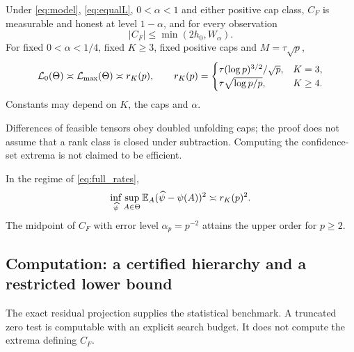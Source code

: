 \begin{theorem}\label{thm:full_minimax}
Under \eqref{eq:model}, \eqref{eq:equalL}, $0<\alpha<1$ and either positive cap class,
$C_F$ is measurable and honest at level $1-\alpha$, and for every observation
\begin{equation}\label{eq:diameter}
 |C_F|\le\min(2h_0,W_\alpha).
\end{equation}
For fixed $0<\alpha<1/4$, fixed $K\ge3$, fixed positive caps and $M=\tau\sqrt p$,
\begin{equation}\label{eq:full_rates}
 \mathcal L_0(\Theta)\asymp\mathcal L_{\max}(\Theta)\asymp r_K(p),
 \qquad
 r_K(p)=
 \begin{cases}
 \tau(\log p)^{3/2}/\sqrt p,&K=3,\\
 \tau\sqrt{\log p/p},&K\ge4.
 \end{cases}
\end{equation}
Constants may depend on $K$, the caps and $\alpha$.
\end{theorem}

Differences of feasible tensors obey doubled unfolding caps; the proof does not assume that a rank class is closed under subtraction. Computing the confidence-set extrema is not claimed to be efficient.

\begin{proposition}\label{prop:mse_sharp}
In the regime of \eqref{eq:full_rates},
\[
 \inf_{\widehat\psi}\sup_{A\in\Theta}
          \mathbb E_A(\widehat\psi-\psi(A))^2\asymp r_K(p)^2.
\]
The midpoint of $C_F$ with error level $\alpha_p=p^{-2}$ attains the upper order for $p\ge2$.
\end{proposition}

\subsection{Computation: a certified hierarchy and a restricted lower bound}\label{sec:computation}

The exact residual projection supplies the statistical benchmark. A truncated zero test is computable with an explicit search budget. It does not compute the extrema defining $C_F$.

